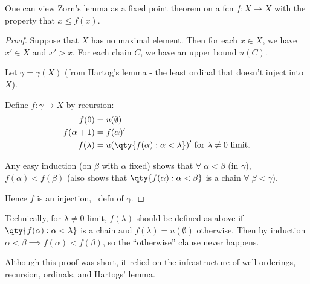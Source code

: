 One can view Zorn's lemma as a fixed point theorem on a fcn $f \colon X \to X$ with the property that $x \leq f(x)$.

\begin{proof}
    Suppose that $X$ has no maximal element.
    Then for each $x \in X$, we have $x' \in X$ and $x' > x$.
    For each chain $C$, we have an upper bound $u(C)$.

    Let $\gamma = \gamma(X)$ (from Hartog's lemma - the least ordinal that doesn't inject into $X$).

    Define $f : \gamma \to X$ by recursion:
    \begin{align*}
        f(0) &= u(\emptyset) \\
        f(\alpha + 1) &= f(\alpha)' \\
        f(\lambda) &= u(\qty{f(\alpha) : \alpha < \lambda})' \text{ for $\lambda \neq 0$ limit}.
    \end{align*}

    Any easy induction (on $\beta$ with $\alpha$ fixed) shows that $\forall \; \alpha < \beta$ (in $\gamma$), $f(\alpha) < f(\beta)$ (also shows that $\qty{f(\alpha) : \alpha < \beta}$ is a chain $\forall \; \beta < \gamma$).

    Hence $f$ is an injection, \Lightning \ defn of $\gamma$.
\end{proof}

\begin{remark}
    Technically, for $\lambda \neq 0$ limit, $f(\lambda)$ should be defined as above if $\qty{f(\alpha) : \alpha < \lambda}$ is a chain and $f(\lambda) = u(\emptyset)$ otherwise.
    Then by induction $\alpha < \beta \implies f(\alpha) < f(\beta)$, so the ``otherwise'' clause never happens.
\end{remark}

\begin{remark}
    Although this proof was short, it relied on the infrastructure of well-orderings, recursion, ordinals, and Hartogs' lemma.
\end{remark}

